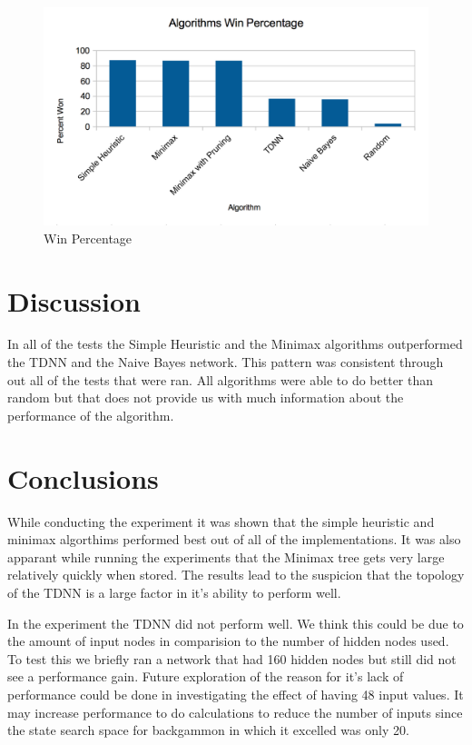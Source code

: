 \documentclass[12pt,letterpaper]{article}
\begin{document}
\begin{figure}[h]
\begin{center}
\includegraphics[width=7in]{winpercent.png}
\end{center}
\caption{Win Percentage}
\label{WinGraph}
\end{figure}

\clearpage

\section{Discussion}
In all of the tests the Simple Heuristic and the Minimax algorithms outperformed the TDNN and the Naive Bayes network. This pattern was consistent through out all of the tests that were ran. All algorithms were able to do better than random but that does not provide us with much information about the performance of the algorithm. 

\section{Conclusions}
While conducting the experiment it was shown that the simple heuristic and minimax algorthims performed best out of all of the implementations. It was also apparant while running the experiments that the Minimax tree gets very large relatively quickly when stored. The results lead to the suspicion that the topology of the TDNN is a large factor in it's ability to perform well.

In the experiment the TDNN did not perform well. We think this could be due to the amount of input nodes in comparision to the number of hidden nodes used. To test this we briefly ran a network that had 160 hidden nodes but still did not see a performance gain. Future exploration of the reason for it's lack of performance could be done in investigating the effect of having 48 input values. It may increase performance to do calculations to reduce the number of inputs since the state search space for backgammon in which it excelled was only 20. 



\newpage



\nocite{*}
\end{document}
